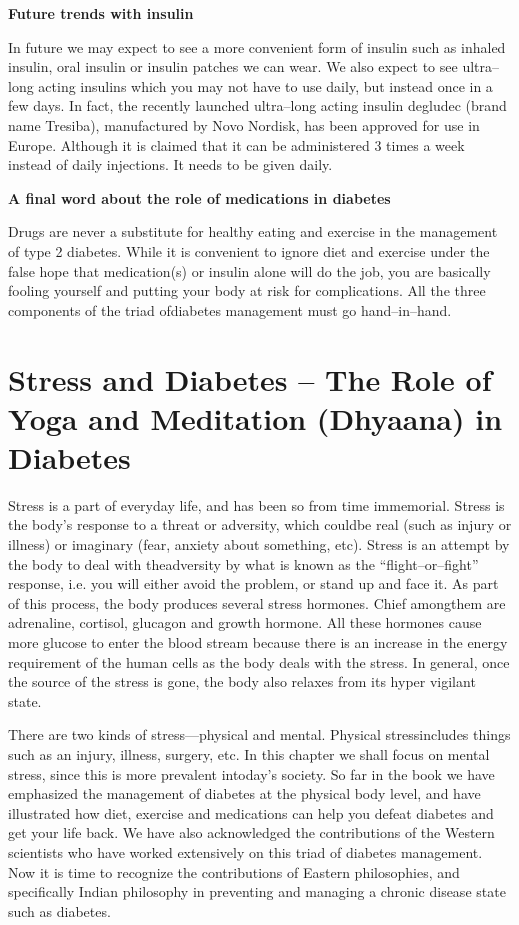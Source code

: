\noindent\textbf{Future trends with insulin}

In future we may expect to see a more convenient form of insulin such as inhaled insulin, oral insulin or insulin patches we can wear. We also expect to see ultra–long acting insulins which you may not have to use daily, but instead once in a few days. In fact, the recently launched ultra–long acting insulin degludec (brand name Tresiba), manufactu\-red by Novo Nordisk, has been approved for use in Europe. Although it is claimed that it can be administered 3 times a week instead of daily injections. It needs to be given daily.

\noindent\textbf{A final word about the role of medications in diabetes}

Drugs are never a substitute for healthy eating and exercise in the management of type 2 diabetes. While it is convenient to ignore diet and exercise under the false hope that medication(s) or insulin alone will do the job, you are basically fooling yourself and putting your body at risk for complications. All the three components of the triad of\break diabetes management must go hand–in–hand.

\newpage

\chapter{Stress and Diabetes – The Role of Yoga and Meditation (Dhyaana) in Diabetes}\label{chap27}

Stress is a part of everyday life, and has been so from time immemorial. Stress is the body’s response to a threat or adversity, which could\break be real (such as injury or illness) or imaginary (fear, anxiety about something, etc). Stress is an attempt by the body to deal with the\break adversity by what is known as the “flight–or–fight” response, i.e. you will either avoid the problem, or stand up and face it. As part of this process, the body produces several stress hormones. Chief among\break them are adrenaline, cortisol, glucagon and growth hormone. All these hormones cause more glucose to enter the blood stream because there is an increase in the energy requirement of the human cells as the body deals with the stress. In general, once the source of the stress is gone, the body also relaxes from its hyper vigilant state.

There are two kinds of stress—physical and mental. Physical stress\break includes things such as an injury, illness, surgery, etc. In this chapter we shall focus on mental stress, since this is more prevalent in\break today’s society. So far in the book we have emphasized the management of diabetes at the physical body level, and have illustrated how diet, exercise and medications can help you defeat diabetes and get your life back. We have also acknowledged the contributions of the Western scientists who have worked extensively on this triad of diabetes management. Now it is time to recognize the contributions of Eastern philosophies, and specifically Indian philosophy in preventing and managing a chronic disease state such as diabetes.

